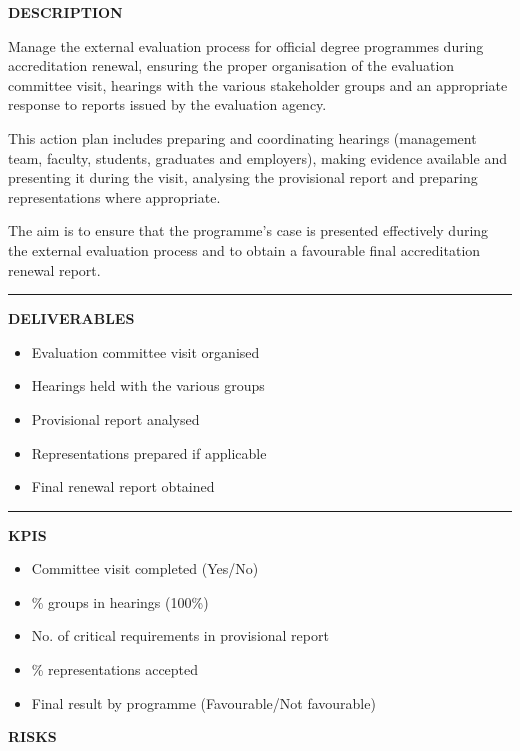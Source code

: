 \documentclass[11pt,a4paper]{scrreprt}
\newcommand{\fieldlabel}[1]{%
  {\footnotesize\sffamily\bfseries\color{mutedcolor}\MakeUppercase{#1}}\par\nopagebreak[4]
}
\newcommand{\fieldsep}{\vspace{3pt}\noindent\textcolor{bordercolor}{\rule{\linewidth}{0.4pt}}\vspace{3pt}\par}
\begin{document}
\begin{tcolorbox}[pabox={aacolor}{A.P.3.2 \enspace\textbullet\enspace Management of the External Evaluation Process and Accreditation Renewal}]

\fieldlabel{Description}
{\small Manage the external evaluation process for official degree programmes during accreditation renewal, ensuring the proper organisation of the evaluation committee visit, hearings with the various stakeholder groups and an appropriate response to reports issued by the evaluation agency. 

This action plan includes preparing and coordinating hearings (management team, faculty, students, graduates and employers), making evidence available and presenting it during the visit, analysing the provisional report and preparing representations where appropriate. 

The aim is to ensure that the programme's case is presented effectively during the external evaluation process and to obtain a favourable final accreditation renewal report. }\par
\fieldsep
\fieldlabel{Deliverables}
{\small \begin{itemize}[noitemsep,topsep=2pt]
\item Evaluation committee visit organised
\item Hearings held with the various groups
\item Provisional report analysed
\item Representations prepared if applicable
\item Final renewal report obtained
\end{itemize}}\par
\fieldsep
\fieldlabel{KPIs}
{\small \begin{itemize}[noitemsep,topsep=2pt]
\item Committee visit completed (Yes/No)
\item \% groups in hearings (100\%)
\item No. of critical requirements in provisional report
\item \% representations accepted
\item Final result by programme (Favourable/Not favourable)
\end{itemize}}\par
\end{tcolorbox}
\begin{tcolorbox}[riskbox]
{\footnotesize\sffamily\bfseries\color{red!50!black} RISKS}\par{}
\end{tcolorbox}
\end{document}
